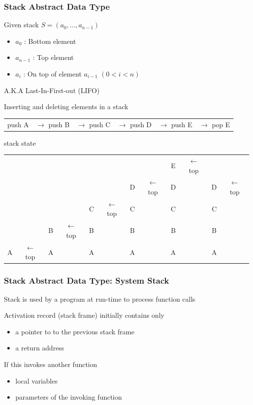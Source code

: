 \documentclass[newPxFont,sthlmFooter,nooffset]{beamer}
\begin{document}
\begin{frame}[t]
  \frametitle{Stack Abstract Data Type}
Given stack $S = ( a_0, \ldots, a_{n-1})$
\begin{itemize}
\item $a_0$ : Bottom element
\item $a_{n-1}$ : Top element
\item $a_{i}$ : On top of element $a_{i-1}$ $(0 < i < n)$
\end{itemize}

A.K.A Last-In-First-out (LIFO)

\bigskip

Inserting and deleting elements in a stack
{\footnotesize  \begin{centering}
\begin{tabular}{!{}c<{}c<{}c<{}c<{}c<{}c}
push A & $\rightarrow$ push B &  $\rightarrow$ push C &  $\rightarrow$ push D &  $\rightarrow$ push E &  $\rightarrow$ pop E \\
    \end{tabular}
  \end{centering}}

{ stack state}

{\footnotesize  \begin{centering}
\begin{tabular}{!{} c<{}c<{}c<{}c<{}c<{}c<{}c<{}c<{}c<{}c<{}c<{}c}
      & &   & &    &  &   &  & E & $\leftarrow$ top &   & \\
      & &   &  &   &  & D & $\leftarrow$ top & D  & & D &  $\leftarrow$ top\\
      & &   &  & C & $\leftarrow$ top & C  & & C & & C &\\
      & & B & $\leftarrow$ top & B & & B & & B & & B &\\
      A & $\leftarrow$ top & A & & A & & A & & A & & A &\\
    \end{tabular}
  \end{centering}}
\end{frame}

\begin{frame}[t]
  \frametitle{Stack Abstract Data Type: System Stack}
Stack is used by a program at run-time to process function calls

Activation record (stack frame) initially contains only 
\begin{itemize}
\item a pointer to to the previous stack frame
\item a return address
\end{itemize}
If this invokes another function
\begin{itemize}
\item local variables
\item parameters of the invoking function
\end{itemize}

\end{frame}
\end{document}

